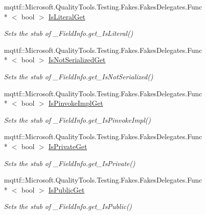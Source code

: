 \begin{DoxyCompactItemize}
mqttf\-::\-Microsoft.\-Quality\-Tools.\-Testing.\-Fakes.\-Fakes\-Delegates.\-Func\\*
$<$ bool $>$ \hyperlink{class_system_1_1_runtime_1_1_interop_services_1_1_fakes_1_1_stub___field_info_a66efb51cffa85f3981440b031cd964e4}{Is\-Literal\-Get}
\begin{DoxyCompactList}\small\item\em Sets the stub of \-\_\-\-Field\-Info.\-get\-\_\-\-Is\-Literal()\end{DoxyCompactList}\item 
mqttf\-::\-Microsoft.\-Quality\-Tools.\-Testing.\-Fakes.\-Fakes\-Delegates.\-Func\\*
$<$ bool $>$ \hyperlink{class_system_1_1_runtime_1_1_interop_services_1_1_fakes_1_1_stub___field_info_a972d18dfd1a9cc9afaa0d1083fe84ebc}{Is\-Not\-Serialized\-Get}
\begin{DoxyCompactList}\small\item\em Sets the stub of \-\_\-\-Field\-Info.\-get\-\_\-\-Is\-Not\-Serialized()\end{DoxyCompactList}\item 
mqttf\-::\-Microsoft.\-Quality\-Tools.\-Testing.\-Fakes.\-Fakes\-Delegates.\-Func\\*
$<$ bool $>$ \hyperlink{class_system_1_1_runtime_1_1_interop_services_1_1_fakes_1_1_stub___field_info_ac5e07cdede9b031181af04fc26a67bd7}{Is\-Pinvoke\-Impl\-Get}
\begin{DoxyCompactList}\small\item\em Sets the stub of \-\_\-\-Field\-Info.\-get\-\_\-\-Is\-Pinvoke\-Impl()\end{DoxyCompactList}\item 
mqttf\-::\-Microsoft.\-Quality\-Tools.\-Testing.\-Fakes.\-Fakes\-Delegates.\-Func\\*
$<$ bool $>$ \hyperlink{class_system_1_1_runtime_1_1_interop_services_1_1_fakes_1_1_stub___field_info_aba599c34b199114873c112c14048c810}{Is\-Private\-Get}
\begin{DoxyCompactList}\small\item\em Sets the stub of \-\_\-\-Field\-Info.\-get\-\_\-\-Is\-Private()\end{DoxyCompactList}\item 
mqttf\-::\-Microsoft.\-Quality\-Tools.\-Testing.\-Fakes.\-Fakes\-Delegates.\-Func\\*
$<$ bool $>$ \hyperlink{class_system_1_1_runtime_1_1_interop_services_1_1_fakes_1_1_stub___field_info_a38c11e9573e94fad141b0cbd228e370f}{Is\-Public\-Get}
\begin{DoxyCompactList}\small\item\em Sets the stub of \-\_\-\-Field\-Info.\-get\-\_\-\-Is\-Public()\end{DoxyCompactList}\item 

\end{DoxyCompactItemize}
